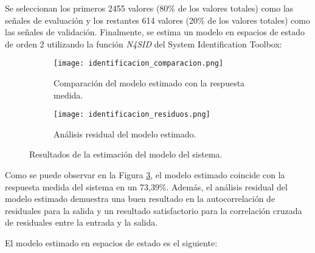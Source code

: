 Se seleccionan los primeros 2455 valores (80\% de los valores totales) como las señales de evaluación
y los restantes 614 valores (20\% de los valores totales) como las señales de validación. Finalmente,
se estima un modelo en espacios de estado de orden 2 utilizando la función \textit{N4SID} del System Identification Toolbox:

\begin{figure}[H]
    \centering

    \begin{subfigure}[b]{\textwidth}
        \centering
        \texttt{[image: identificacion\_comparacion.png]}
        \caption{Comparación del modelo estimado con la respuesta medida.}
        \vspace{0.25cm}
        \label{fig:identificacion_comparacio n}
    \end{subfigure}
    \begin{subfigure}[b]{\textwidth}
        \centering
        \texttt{[image: identificacion\_residuos.png]}
        \caption{Análisis residual del modelo estimado.}
        \label{fig:identificacion_residuos}
    \end{subfigure}

    \vspace{-0.25cm}
    \caption{Resultados de la estimación del modelo del sistema.}
    \label{fig:identificacion_resultados}
\end{figure}
\vspace{-0.5cm}

Como se puede observar en la Figura \ref{fig:identificacion_resultados}, el modelo estimado coincide
con la respuesta medida del sistema en un 73,39\%. Además, el análisis residual del modelo estimado
demuestra una buen resultado en la autocorrelación de residuales para la salida y un resultado
satisfactorio para la correlación cruzada de residuales entre la entrada y la salida.

El modelo estimado en espacios de estado es el siguiente:

